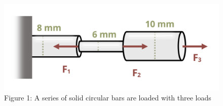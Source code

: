 \documentclass[
  letterpaper,
  DIV=11,
  numbers=noendperiod]{scrreprt}
\begin{document}

\begin{figure}[H]

{\centering \includegraphics{images/138.png}

}

\caption{Figure 1: A series of solid circular bars are loaded with three
loads}

\end{figure}%
\end{document}
